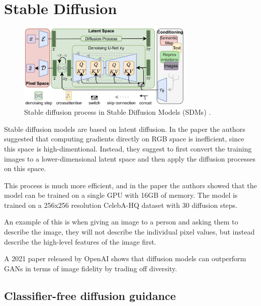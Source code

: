 \section{Stable Diffusion}
\label{sec:stable_diffusion}

\begin{figure}
    \centering
    \includegraphics[width=0.75\textwidth]{images/diffusion_models/stable_diffusion/stable_diffusion.png}
    \caption{Stable diffusion process in Stable Diffusion Models (SDMs) \cite{stable_diffusion}.}
    \label{fig:stable_diffusion}
\end{figure}

Stable diffusion models are based on latent diffusion. In the paper \cite{stable_diffusion} the authors suggested that computing gradients directly on RGB space is inefficient, since this space is high-dimentional. Instead, they suggest to first convert the training images to a lower-dimensional latent space and then apply the diffusion processes on this space.

This process is much more efficient, and in the paper \cite{stable_diffusion} the authors showed that the model can be trained on a single GPU with 16GB of memory. The model is trained on a 256x256 resolution CelebA-HQ dataset with 30 diffusion steps.

An example of this is when giving an image to a person and asking them to describe the image, they will not describe the individual pixel values, but instead describe the high-level features of the image first.

A 2021 paper released by OpenAI \cite{openai_diffusion_beats_gans} shows that diffusion models can outperform GANs in terms of image fidelity by trading off diversity.








\subsection{Classifier-free diffusion guidance}

